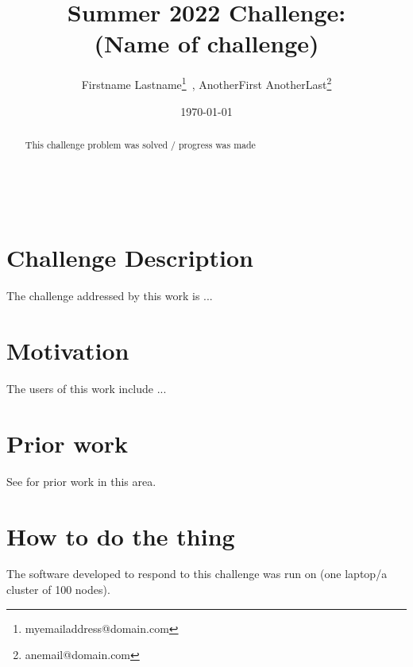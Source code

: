 \documentclass{article}
\begin{document}
    \begin{minipage}[h]{\textwidth}
        \title{Summer 2022 Challenge:\\(Name of challenge)}
        \author{Firstname Lastname\footnote{myemailaddress@domain.com}\ , 
        AnotherFirst AnotherLast\footnote{anemail@domain.com}}
        \date{\today}
            \maketitle
        \begin{abstract}
            This challenge problem was solved / progress was made
        \end{abstract}
    \end{minipage}

\ \\


\section{Challenge Description} %

The challenge addressed by this work is ...

\section{Motivation} %

The users of this work include ...

\section{Prior work} %

See \cite{texbook} for prior work in this area.

\section{How to do the thing}

The software developed to respond to this challenge was run on (one laptop/a cluster of 100 nodes).
\end{document}
